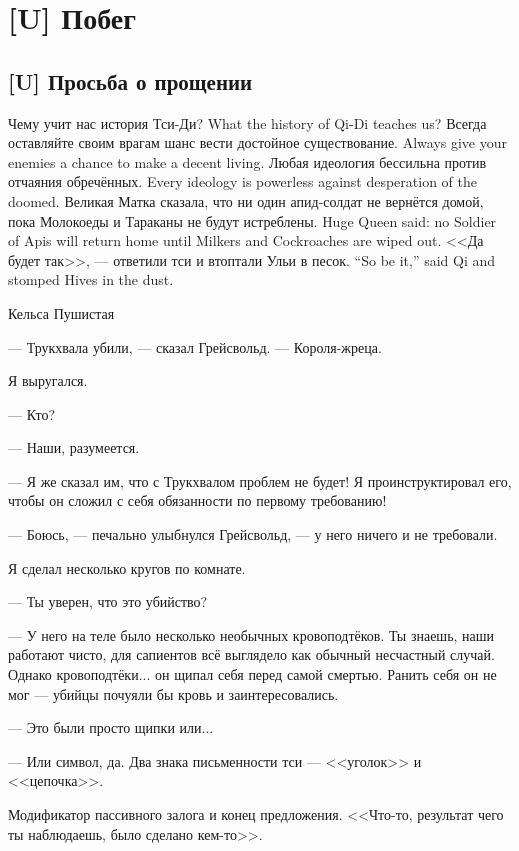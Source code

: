 \chapter{[U] Побег}

\section{[U] Просьба о прощении}

\epigraph
{
{Чему учит нас история Тси-Ди?}
{What the history of Qi-Di teaches us?}
{Всегда оставляйте своим врагам шанс вести достойное существование.}
{Always give your enemies a chance to make a decent living.}
{Любая идеология бессильна против отчаяния обречённых.}
{Every ideology is powerless against desperation of the doomed.}
{Великая Матка сказала, что ни один апид-солдат не вернётся домой, пока Молокоеды и Тараканы не будут истреблены.}
{Huge Queen said: no Soldier of Apis will return home until Milkers and Cockroaches are wiped out.}
{<<Да будет так>>, --- ответили тси и втоптали Ульи в песок.}
{``So be it,'' said Qi and stomped Hives in the dust.}
}{Кельса Пушистая}

\textspace

--- Трукхвала убили, --- сказал Грейсвольд.
--- Короля-жреца.

Я выругался.

--- Кто?

--- Наши, разумеется.

--- Я же сказал им, что с Трукхвалом проблем не будет!
Я проинструктировал его, чтобы он сложил с себя обязанности по первому требованию!

--- Боюсь, --- печально улыбнулся Грейсвольд, --- у него ничего и не требовали.

Я сделал несколько кругов по комнате.

--- Ты уверен, что это убийство?

--- У него на теле было несколько необычных кровоподтёков.
Ты знаешь, наши работают чисто, для сапиентов всё выглядело как обычный несчастный случай.
Однако кровоподтёки... он щипал себя перед самой смертью.
Ранить себя он не мог --- убийцы почуяли бы кровь и заинтересовались.

--- Это были просто щипки или...

--- Или символ, да.
Два знака письменности тси --- <<уголок>> и <<цепочка>>.

Модификатор пассивного залога и конец предложения.
<<Что-то, результат чего ты наблюдаешь, было сделано кем-то>>.

